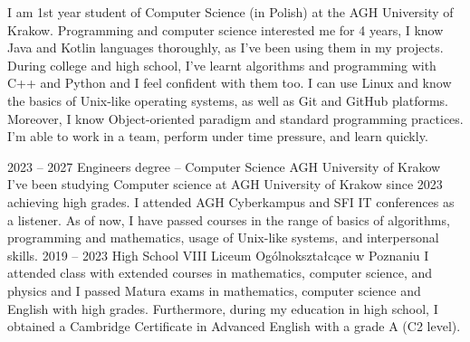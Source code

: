 \documentclass[8pt]{developercv} %
\begin{document}
\begin{minipage}[t]{0.5\textwidth} %
  \vspace{-\baselineskip}  %
  I am 1st year student of Computer Science (in Polish) at the AGH University of Krakow.
  Programming and computer science interested me for 4 years,
  I know Java and Kotlin languages thoroughly, as I’ve been using them in my projects.
  During college and high school, I’ve learnt algorithms and programming with C++ and Python and I feel confident with them too.
  I can use Linux and know the basics of Unix-like operating systems, as well as Git and GitHub platforms.
  Moreover, I know Object-oriented paradigm and standard programming practices.
  I’m able to work in a team, perform under time pressure, and learn quickly.
\end{minipage}
\hfill %
\begin{minipage}[t]{0.45\textwidth} %
	\vspace{-\baselineskip}
	\begin{barchart}{5.5}
	\end{barchart}
\end{minipage}





\begin{entrylist}
  \entry
    {2023 -- 2027}
    {Engineers degree -- Computer Science}
    {AGH University of Krakow}
    {
      I've been studying Computer science at AGH University of Krakow since 2023 achieving high grades.
      I attended AGH Cyberkampus and SFI IT conferences as a listener.
      As of now, I have passed courses in the range of basics of algorithms, programming and mathematics, usage of Unix-like systems, and interpersonal skills.
    }
  \entry
    {2019 -- 2023}
    {High School}
    {VIII Liceum Ogólnokształcące w Poznaniu}
    {
      I attended class with extended courses in mathematics, computer science, and physics and I passed Matura exams in mathematics, computer science and English with high grades.
      Furthermore, during my education in high school, I obtained a Cambridge Certificate in Advanced English with a grade A (C2 level).
    }
\end{entrylist}
\end{document}
